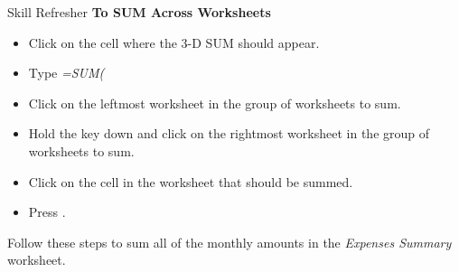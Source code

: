 \begin{center}
	\begin{sklbox}{Skill Refresher}
		\textbf{To SUM Across Worksheets}
		\\
		\begin{itemize}
			\setlength{\itemsep}{0pt}
			\setlength{\parskip}{0pt}
			\setlength{\parsep}{0pt}
			
			\item Click on the cell where the $ 3 $-D SUM should appear.
			\item Type \textit{=SUM(}
			\item Click on the leftmost worksheet in the group of worksheets to sum.
			\item Hold the  key down and click on the rightmost worksheet in the group of worksheets to sum.
			\item Click on the cell in the worksheet that should be summed.
			\item Press .
			
		\end{itemize}
	\end{sklbox}
\end{center}

Follow these steps to sum all of the monthly amounts in the \textit{Expenses Summary} worksheet.

